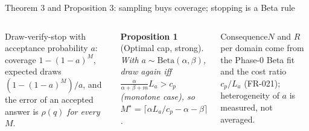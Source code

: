 \documentclass[aspectratio=169,10pt]{beamer}
\newtheorem{proposition}{Proposition}
\begin{document}
\begin{frame}{Theorem 3 and Proposition 3: sampling buys coverage; stopping is a Beta rule}
\begin{columns}[T]
\begin{theorem}
Draw-verify-stop with acceptance probability $a$: coverage $1-(1-a)^M$, expected draws $(1-(1-a)^M)/a$, and the error of an accepted answer is $\rho(q)$ \emph{for every} $M$.
\end{theorem}
\begin{proposition}[Optimal cap, strong]
With $a\sim\mathrm{Beta}(\alpha,\beta)$, draw again iff $\frac{\alpha}{\alpha+\beta+m}L_a>c_p$ (monotone case), so
$M^\star=\lceil\alpha L_a/c_p-\alpha-\beta\rceil$.
\end{proposition}
\begin{alertblock}{Consequence}$N$ and $R$ per domain come from the Phase-0 Beta fit and the cost ratio $c_p/L_a$ (FR-021); heterogeneity of $a$ is measured, not averaged.\end{alertblock}
\end{columns}
\end{frame}
\end{document}
